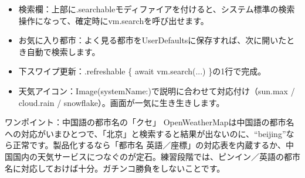 
\begin{itemize}
  \item 検索欄：上部に.searchableモディファイアを付けると、システム標準の検索操作になって、確定時にvm.searchを呼び出せます。
  \item お気に入り都市：よく見る都市をUserDefaultsに保存すれば、次に開いたとき自動で検索します。
  \item 下スワイプ更新：.refreshable \{ await vm.search(...) \}の1行で完成。
  \item 天気アイコン：Image(systemName:)で説明に合わせて対応付け（sun.max / cloud.rain / snowflake）。画面が一気に生き生きします。
\end{itemize}

\begin{tcbinfo}{ワンポイント：中国語の都市名の「クセ」}
OpenWeatherMapは中国語の都市名への対応がいまひとつで、「北京」と検索すると結果が出ないのに、“beijing”なら正常です。製品化するなら「都市名 英語／座標」の対応表を内蔵するか、中国国内の天気サービスにつなぐのが定石。練習段階では、ピンイン／英語の都市名に対応しておけば十分。ガチンコ勝負をしないことです。

\end{tcbinfo}

